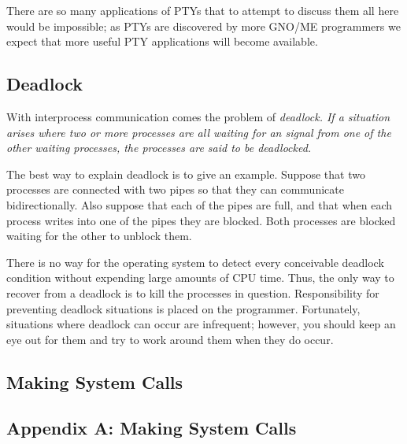 \documentclass{report}
\begin{document}
There are so many applications of PTYs that
to attempt to discuss them all here would be impossible; as PTYs
are discovered by more GNO/ME programmers we expect that more
useful PTY applications will become available.

\section{Deadlock}

With interprocess communication comes the
problem of \em deadlock\rm. If a situation arises where two or
more processes are all waiting for an signal from one of the
other waiting processes, the processes are said to be deadlocked.

The best way to explain deadlock is to give
an example. Suppose that two processes are connected with two
pipes so that they can communicate bidirectionally. Also suppose
that each of the pipes are full, and that when each process
writes into one of the pipes they are blocked. 
Both processes are blocked waiting for the other to unblock them.

There is no way for the operating system to
detect every conceivable deadlock condition without expending
large amounts of CPU time. Thus, the only way to recover from a
deadlock is to kill the processes in question. Responsibility for
preventing deadlock situations is placed on the programmer.
Fortunately, situations where deadlock can occur are infrequent;
however, you should keep an eye out for them and try to work
around them when they do occur.


\appendix

%
%

\begin{latexonly}
\chapter{Making System Calls}
\end{latexonly}
\begin{htmlonly}
\chapter{Appendix A:  Making System Calls}
\end{htmlonly}

\begin{latexonly}
\end{latexonly}
\begin{htmlonly}
\end{htmlonly}
\end{document}
